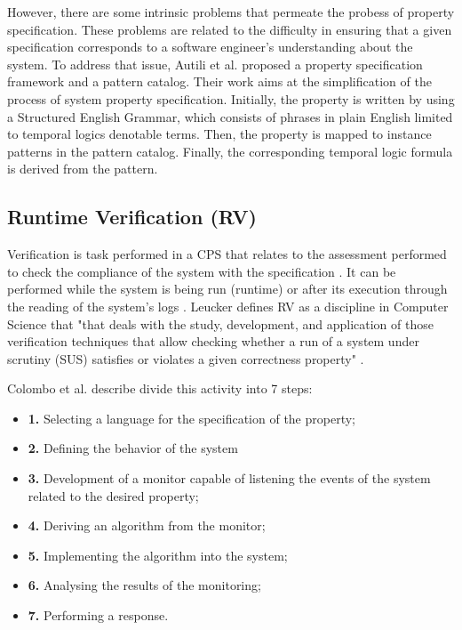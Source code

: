 However, there are some intrinsic problems that permeate the probess of property specification. These problems are related to the difficulty in ensuring that a given specification corresponds to a software engineer's understanding about the system. To address that issue, Autili et al. \cite{2015PropertySpecCatalog} proposed a property specification  framework and a pattern catalog. Their work aims at the simplification of the process of system property specification. Initially, the property is written by using a Structured English Grammar, which consists of phrases in plain English limited to temporal logics denotable terms. Then, the property is mapped to instance patterns in the pattern catalog. Finally, the corresponding temporal logic formula is derived from the pattern.

\subsection{Runtime Verification (RV)}

Verification is task performed in a CPS that relates to the assessment performed to check the compliance of the system with the specification \cite{2014PerceptionsSOTAV&VCPS}. It can be performed while the system is being run (runtime) or after its execution through the reading of the system's logs \cite{colombo2021runtime}. Leucker defines RV as a discipline in Computer Science that "that deals with the study, development, and application of those verification techniques that allow checking whether a run of a system under scrutiny (SUS) satisfies or violates a given correctness property"  \cite{leucker2011teaching}.

Colombo et al. \cite{colombo2021runtime} describe divide this activity into 7 steps: 
\begin{itemize}
    \item \textbf{1.} Selecting a language for the specification of the property;
    
    \item \textbf{2.} Defining the behavior of the system
    
    \item \textbf{3.} Development of a monitor capable of listening the events of the system related to the desired property;
    
    \item \textbf{4.} Deriving an algorithm from the monitor;
    
    \item \textbf{5.} Implementing the algorithm into the system;
    
	\item \textbf{6.} Analysing the results of the monitoring;

	\item \textbf{7.} Performing a response.
    
\end{itemize}

